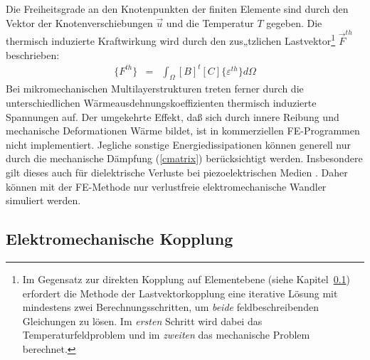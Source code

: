 Die Freiheitsgrade an den Knotenpunkten der finiten Elemente sind
durch den Vektor der Knotenverschiebungen $\vec u$ und die Temperatur
$T$ gegeben. Die thermisch induzierte Kraftwirkung wird durch den
zus„tzlichen Lastvektor\footnote{Im Gegensatz zur direkten Kopplung
auf Elementebene (siehe Kapitel~\ref{elektromechanischekopplung}) erfordert
die Methode der Lastvektorkopplung eine iterative Lösung mit mindestens zwei
Berechnungsschritten, um {\em beide} feldbeschreibenden Gleichungen zu
lösen. Im {\em ersten} Schritt wird dabei das Temperaturfeldproblem
und im {\em zweiten} das mechanische Problem berechnet.}
$\vec F^{th}$ beschrieben:
\begin{eqnarray}
\label{thermkraft}
 \{F^{th}\} & = & \int_{\Omega} [B]^{t} [C] \{\varepsilon^{th}\} d\Omega
\end{eqnarray}
%
Bei mikromechanischen Multilayerstrukturen treten ferner durch die
unterschiedlichen Wärmeausdehnungskoeffizienten thermisch induzierte
Spannungen auf. Der umgekehrte Effekt, daß sich durch innere Reibung und
mechanische Deformationen Wärme bildet, ist in kommerziellen FE-Programmen
nicht implementiert. Jegliche sonstige Energiedissipationen können generell
nur durch die mechanische Dämpfung (\ref{cmatrix}) berücksichtigt werden.
Insbesondere gilt dieses auch für dielektrische Verluste bei
piezoelektrischen Medien \cite{Ecc92}. Daher können mit der FE-Methode nur
verlustfreie elektromechanische Wandler simuliert werden.


\subsection{Elektromechanische Kopplung}
\label{elektromechanischekopplung}

